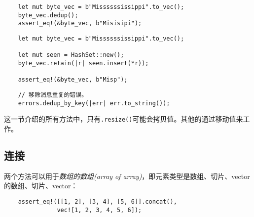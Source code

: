 \begin{verbatim}
    let mut byte_vec = b"Missssssissippi".to_vec();
    byte_vec.dedup();
    assert_eq!(&byte_vec, b"Misisipi");
\end{verbatim}
\begin{verbatim}
    let mut byte_vec = b"Missssssissippi".to_vec();

    let mut seen = HashSet::new();
    byte_vec.retain(|r| seen.insert(*r));

    assert_eq!(&byte_vec, b"Misp");
\end{verbatim}



\begin{verbatim}
    // 移除消息重复的错误。
    errors.dedup_by_key(|err| err.to_string());
\end{verbatim}

这一节介绍的所有方法中，只有\texttt{.resize()}可能会拷贝值。其他的通过移动值来工作。

\subsection{连接}
两个方法可以用于\emph{数组的数组(array of array)}，即元素类型是数组、切片、vector的数组、切片、vector：

\begin{verbatim}
    assert_eq!([[1, 2], [3, 4], [5, 6]].concat(),
               vec![1, 2, 3, 4, 5, 6]);
\end{verbatim}

